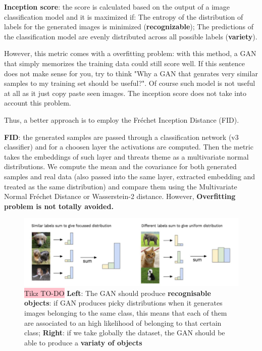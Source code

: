 \textbf{Inception score}:  the  score is calculated based on the output of a image classification model and it is maximized if:  The entropy of the distribution of labels for the generated images is minimized (\textbf{recognizable}); The predictions of the classification model are evenly distributed
across all possible labels (\textbf{variety}).

However, this metric comes with a overfitting problem: with this method, a GAN that simply memorizes the training data could still score well. If this sentence does not make sense for you, try to think "Why a GAN that genrates very similar samples to my training set should be useful?". Of course such model is not useful at all as it just copy paste seen images. The inception score does not  take into account this problem.


Thus, a better approach is to employ the Fréchet Inception Distance (FID).

\textbf{FID}: the generated samples are passed through a classification network (v3 classifier) and for a choosen layer the activations are computed. Then the metric takes the embeddings of such layer and threats theme as a multivariate normal distributions. We compute the mean and the covariance for both generated samples and real data (also passed into the same layer, extracted embedding and treated as the same distribution) and compare them using the Multivariate Normal Fréchet Distance or Wasserstein-2 distance. However, \textbf{Overfitting problem is not totally avoided.}


\begin{figure}[!htbp]
    \centering
    \includegraphics[width=\linewidth]{tikz/Inception score.png}
    \caption{{\color{red}\colorbox{pink}{Tikz TO-DO}} \textbf{Left}: The GAN should produce \textbf{recognisable objects}: if GAN produces picky distributions when it generates images belonging to the same class, this means that each of them are associated to an high likelihood of belonging to that certain class; \textbf{Right}: if we take globally the dataset, the GAN should be able to produce a \textbf{variaty of objects}}
    \label{fig:inception-score}
\end{figure}

